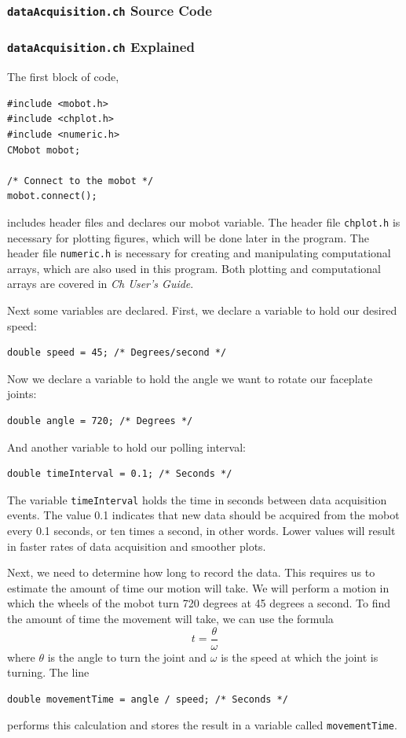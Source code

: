\documentclass{article}
\begin{document}
\subsubsection{\texttt{dataAcquisition.ch} Source Code}


\subsubsection{\texttt{dataAcquisition.ch} Explained}
The first block of code,
\begin{verbatim}
#include <mobot.h>
#include <chplot.h>
#include <numeric.h>
CMobot mobot;

/* Connect to the mobot */
mobot.connect();
\end{verbatim}
includes header files and declares our mobot variable. The header file
\texttt{chplot.h} is necessary for plotting figures, which will be done later in the
program. The header file \texttt{numeric.h} is necessary for creating and manipulating
computational arrays, which are also used in this program. Both plotting and computational
arrays are covered in {\it Ch User's Guide}.

Next some variables are declared. First, we declare a variable to hold our
desired speed:
\begin{verbatim}
double speed = 45; /* Degrees/second */
\end{verbatim}
Now we declare a variable to hold the angle we want to rotate our faceplate joints:
\begin{verbatim}
double angle = 720; /* Degrees */
\end{verbatim}
And another variable to hold our polling interval:
\begin{verbatim}
double timeInterval = 0.1; /* Seconds */
\end{verbatim}
The variable \texttt{timeInterval} holds the time in seconds between data acquisition
events. The value 0.1 indicates that new data should be acquired from the mobot
every 0.1 seconds, or ten times a second, in other words. Lower values will result in faster
rates of data acquisition and smoother plots. 

Next, we need to determine how long to record the data. This requires us to estimate the 
amount of time our motion will take. We will perform a motion in which the wheels of the
mobot turn 720 degrees at 45 degrees a second. To find the amount of time the movement 
will take, we can use the formula
\begin{equation*}
t = \frac{\theta}{\omega}
\end{equation*}
where $\theta$ is the angle to turn the joint and $\omega$ is the speed at which the
joint is turning. The line
\begin{verbatim}
double movementTime = angle / speed; /* Seconds */
\end{verbatim}
performs this calculation and stores the result in a variable called \texttt{movementTime}.
\end{document}
